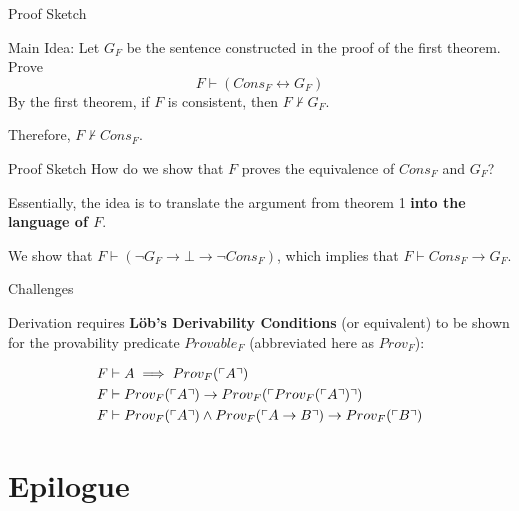 \documentclass{beamer}
\begin{document}
\begin{frame}{Proof Sketch}
  \begin{block}{Main Idea:}
    Let $G_F$ be the \godel{} sentence constructed in the proof of the first
    theorem. Prove
    $$F \vdash (Cons_F \leftrightarrow G_F)$$
    By the first theorem, if $F$ is consistent, then $F \nvdash G_F$.

    Therefore, $F \nvdash Cons_F$.

  \end{block}
\end{frame}

\begin{frame}{Proof Sketch}
  How do we show that $F$ proves the equivalence of $Cons_F$ and $G_F$?

  \pause

  Essentially, the idea is to translate the argument from theorem 1
  \textbf{into the language of $F$}.

  \pause

  We show that $F \vdash (\neg G_F \rightarrow \bot \rightarrow \neg Cons_F)$,
  which implies that $F \vdash Cons_F \rightarrow G_F$.

\end{frame}
\begin{frame}{Challenges}

  Derivation requires \textbf{L\"ob's Derivability Conditions} (or equivalent)
  to be shown for the provability predicate $Provable_F$ (abbreviated here as
  $Prov_F$):

  \begin{align}
    F & \vdash A \implies Prov_F(\ulcorner A \urcorner) \\
    F & \vdash Prov_F(\ulcorner A \urcorner) \rightarrow Prov_F(\ulcorner Prov_F(\ulcorner A \urcorner) \urcorner) \\
    F & \vdash Prov_F(\ulcorner A \urcorner) \land Prov_F(\ulcorner A \rightarrow B \urcorner) \rightarrow Prov_F(\ulcorner B \urcorner)
  \end{align}

\end{frame}

\section{Epilogue}
\end{document}
